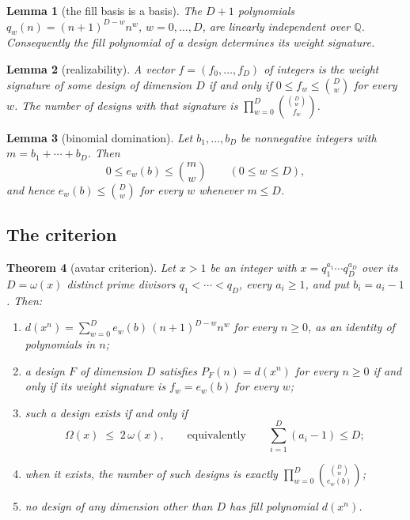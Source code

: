 \documentclass[11pt]{amsart}
\newtheorem{theorem}{Theorem}[section]
\newtheorem{lemma}[theorem]{Lemma}
\theoremstyle{definition}
\theoremstyle{remark}
\begin{document}
\begin{lemma}[the fill basis is a basis]
\label{lem:basis}
The $D+1$ polynomials $q_{w}(n) = (n+1)^{D-w}n^{w}$, $w=0,\dots,D$, are linearly independent over $\mathbb{Q}$. Consequently the fill polynomial of a design determines its weight signature.
\end{lemma}

\begin{lemma}[realizability]
\label{lem:real}
A vector $f = (f_{0},\dots,f_{D})$ of integers is the weight signature of some design of dimension $D$ if and only if $0 \le f_{w} \le \binom{D}{w}$ for every $w$. The number of designs with that signature is $\prod_{w=0}^{D}\binom{\binom{D}{w}}{f_{w}}$.
\end{lemma}

\begin{lemma}[binomial domination]
\label{lem:dom}
Let $b_{1},\dots,b_{D}$ be nonnegative integers with $m = b_{1}+\cdots+b_{D}$. Then
\[
  0 \le e_{w}(b) \le \binom{m}{w} \qquad (0 \le w \le D),
\]
and hence $e_{w}(b) \le \binom{D}{w}$ for every $w$ whenever $m \le D$.
\end{lemma}

\subsection*{The criterion}

\begin{theorem}[avatar criterion]
\label{thm:criterion}
Let $x > 1$ be an integer with $x = q_{1}^{a_{1}}\cdots q_{D}^{a_{D}}$ over its $D = \omega(x)$ distinct prime divisors $q_{1} < \cdots < q_{D}$, every $a_{i} \ge 1$, and put $b_{i} = a_{i}-1$. Then:
\begin{enumerate}
\item[(i)] $\displaystyle d(x^{n}) = \sum_{w=0}^{D} e_{w}(b)\,(n+1)^{D-w}n^{w}$ for every $n \ge 0$, as an identity of polynomials in $n$;
\item[(ii)] a design $F$ of dimension $D$ satisfies $P_{F}(n)=d(x^{n})$ for every $n \ge 0$ if and only if its weight signature is $f_{w} = e_{w}(b)$ for every $w$;
\item[(iii)] such a design exists if and only if
\[
  \Omega(x) \;\le\; 2\,\omega(x), \qquad \text{equivalently} \qquad \sum_{i=1}^{D}(a_{i}-1) \le D ;
\]
\item[(iv)] when it exists, the number of such designs is exactly $\displaystyle \prod_{w=0}^{D}\binom{\binom{D}{w}}{e_{w}(b)}$;
\item[(v)] no design of any dimension other than $D$ has fill polynomial $d(x^{n})$.
\end{enumerate}
\end{theorem}
\end{document}
